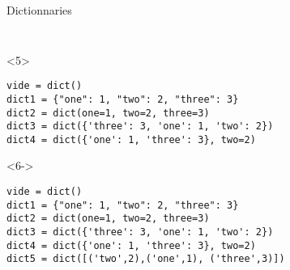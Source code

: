 \begin{frame}[fragile]{Dictionnaries}
\begin{center}
\begin{columns}[onlytextwidth]
\begin{column}{\textwidth}
\begin{onlyenv}
\begin{lstlisting}[style=python,morekeywords={for, in, range, list},basicstyle=\ttfamily\small]
 \end{lstlisting}
      \end{onlyenv}

      \begin{onlyenv}<5>
        \begin{lstlisting}[style=python,morekeywords={for, in, range, list},basicstyle=\ttfamily\small]
vide = dict()
dict1 = {"one": 1, "two": 2, "three": 3}
dict2 = dict(one=1, two=2, three=3)
dict3 = dict({'three': 3, 'one': 1, 'two': 2})
dict4 = dict({'one': 1, 'three': 3}, two=2)
 \end{lstlisting}
      \end{onlyenv}

      \begin{onlyenv}<6->
        \begin{lstlisting}[style=python,morekeywords={for, in, range, list},basicstyle=\ttfamily\small]
vide = dict()
dict1 = {"one": 1, "two": 2, "three": 3}
dict2 = dict(one=1, two=2, three=3)
dict3 = dict({'three': 3, 'one': 1, 'two': 2})
dict4 = dict({'one': 1, 'three': 3}, two=2)
dict5 = dict([('two',2),('one',1), ('three',3)]) \end{lstlisting}
      \end{onlyenv}

    \end{column}
  \end{columns}

  \end{center}

\end{frame}



